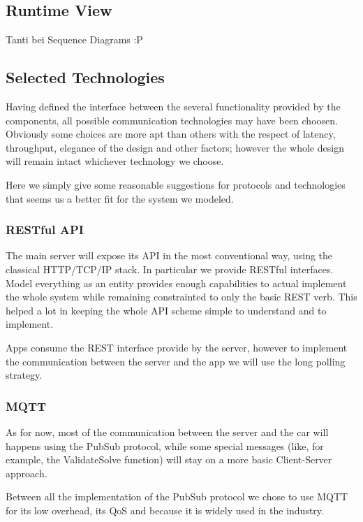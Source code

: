 \documentclass[11pt]{article} %
\begin{document}
\subsection{Runtime View}
{\color{blue} {Tanti bei Sequence Diagrams :P }}


\subsection{Selected Technologies}

Having defined the interface between the several functionality provided by the components, all possible communication technologies may have been choosen. Obviously some choices are more apt than others with the respect of latency, throughput, elegance of the design and other factors; however the whole design will remain intact whichever technology we choose.

Here we simply give some reasonable suggestions for protocols and technologies that seems us a better fit for the system we modeled.

\subsubsection{RESTful API}

The main server will expose its API in the most conventional way, using the classical HTTP/TCP/IP stack. In particular we provide RESTful interfaces. Model everything as an entity provides enough capabilities to actual implement the whole system while remaining constrainted to only the basic REST verb. This helped a lot in keeping the whole API scheme simple to understand and to implement.

Apps consume the REST interface provide by the server, however to implement the communication between the server and the app we will use the long polling strategy.

\subsubsection{MQTT}

As for now, most of the communication between the server and the car will happens using the PubSub protocol, while some special messages (like, for example, the ValidateSolve function) will stay on a more basic Client-Server approach.

 Between all the implementation of the PubSub protocol we chose to use MQTT for its low overhead, its QoS and because it is widely used in the industry.
\end{document}

